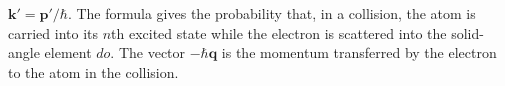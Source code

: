 $\mathbf k'=\mathbf p'/\hbar$. The formula gives the probability that, in a collision, the atom is carried into its $n$th excited state while the electron is scattered into the solid-angle element $do$. The vector $-\hbar\mathbf q$ is the momentum transferred by the electron to the atom in the collision.
